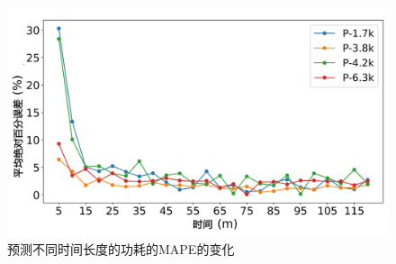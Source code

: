 

\begin{figure}
    \centering
    \includegraphics[width=0.8\linewidth]{figures/chapter4/power_error.pdf}
    \caption{预测不同时间长度的功耗的MAPE的变化}
    \label{fig:mape_evolution}
\end{figure}




